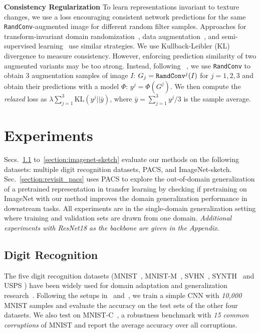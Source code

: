 \documentclass{article} \usepackage{iclr2021_conference,times}
\newcommand{\RandConv}{\texttt{RandConv}}
\begin{document}
\textbf{Consistency Regularization} To learn representations invariant to texture changes, we use a loss encouraging consistent network predictions for the same {\RandConv}-augmented image for different random filter samples. Approaches for transform-invariant domain randomization~\citep{yue2019domain}, data augmentation~\citep{hendrycks2020augmix}, and semi-supervised learning~\citep{berthelot2019mixmatch} use similar strategies. We use Kullback-Leibler (KL) divergence to measure consistency. However, enforcing prediction similarity of two augmented variants may be too strong. Instead, following ~\citep{hendrycks2020augmix}, we use {\RandConv} to obtain 3 augmentation samples of image $I$: $G_j = \text{{\RandConv}}^j(I)$ for $j=1,2,3$ and obtain their predictions with a model $\Phi$: $y^j = \Phi(G^j)$. We then compute the \emph{relaxed} loss as $\lambda\sum_{j=1}^{3}\text{KL}(y^j|| \bar{y})$, where $\bar{y} = \sum_{j=1}^{3}y^j/3$ is the sample average.

\section{Experiments}
Secs.~\ref{section:digits} to~\ref{section:imagenet-sketch} evaluate our methods on the following datasets: multiple digit recognition datasets, PACS, and ImageNet-sketch. Sec.~\ref{section:revisit_pacs} uses PACS to explore the out-of-domain generalization of a pretrained representation in transfer learning by checking if pretraining on ImageNet with our method improves the domain generalization performance in downstream tasks. All experiments are in the single-domain generalization setting where training and validation sets are drawn from one domain. \textit{Additional experiments with ResNet18 as the backbone are given in the Appendix}.



\subsection{Digit Recognition}
\label{section:digits}

The five digit recognition datasets (MNIST~\citep{lecun1998gradient}, MNIST-M~\citep{ganin2016domain}, SVHN~\citep{netzer2011reading}, SYNTH~\citep{ganin2014unsupervised} and USPS \citep{denker1989neural}) have been widely used for domain adaptation and generalization research~\citep{peng2019moment, Peng2019DomainAL,qiao2020learning}. Following the setups in~\citep{volpi2018generalizing} and~\citep{qiao2020learning}, we train a simple CNN with \emph{10,000} MNIST samples and evaluate the accuracy on the test sets of the other four datasets. We also test on MNIST-C~\citep{mu2019mnist}, a robustness benchmark with \emph{15 common corruptions} of MNIST and report the average accuracy over all corruptions.
\end{document}
